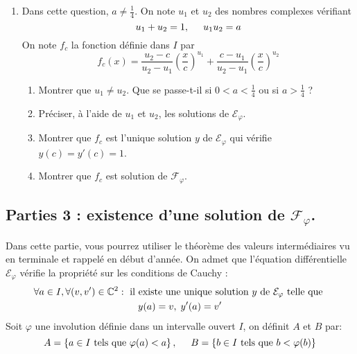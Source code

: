 \begin{enumerate}
\item Dans cette question, $a\neq\frac{1}{4}$. On note $u_1$ et $u_2$ des nombres complexes vérifiant
\begin{displaymath}
  u_1 + u_2 = 1,\hspace{0.5cm} u_1u_2 = a
\end{displaymath}
On note $f_c$ la fonction définie dans $I$ par
\begin{displaymath}
  f_c(x)=\frac{u_2-c}{u_2-u_1}\left( \frac{x}{c}\right)^{u_1}  + \frac{c-u_1}{u_2-u_1}\left(\frac{x}{c}\right)^{u_2}
\end{displaymath}
\begin{enumerate}
  \item Montrer que $u_1\neq u_2$. Que se passe-t-il si $0<a<\frac{1}{4}$ ou si $a>\frac{1}{4}$ ?
  \item Préciser, à l'aide de $u_1$ et $u_2$, les solutions de $\mathcal{E}_\varphi$.
  \item Montrer que $f_c$ est l'unique solution $y$ de $\mathcal{E}_\varphi$ qui vérifie $y(c)=y'(c)=1$.
  \item Montrer que $f_c$ est solution de $\mathcal{F}_\varphi$.
\end{enumerate}

\end{enumerate}

\subsection*{Parties 3 : existence d'une solution de $\mathcal{F}_\varphi$.}
Dans cette partie, vous pourrez utiliser le théorème des valeurs intermédiaires vu en terminale et rappelé en début d'année.
On admet que l'équation différentielle $\mathcal{E}_\varphi$ vérifie la propriété sur les conditions de Cauchy :
\begin{multline*}
  \forall a\in I, \forall (v,v')\in \mathbb{C}^2: \text{ il existe une unique solution $y$ de $\mathcal{E}_\varphi$ telle que }\\ y(a) = v, \; y'(a) = v'
\end{multline*}
Soit $\varphi$ une involution définie dans un intervalle ouvert $I$, on définit $A$ et $B$ par:
  \begin{displaymath}
    A = \left\lbrace a\in I\text{ tels que } \varphi(a) < a\right\rbrace,\hspace{0.5cm}
    B = \left\lbrace b\in I\text{ tels que } b < \varphi(b)\right\rbrace
  \end{displaymath}

